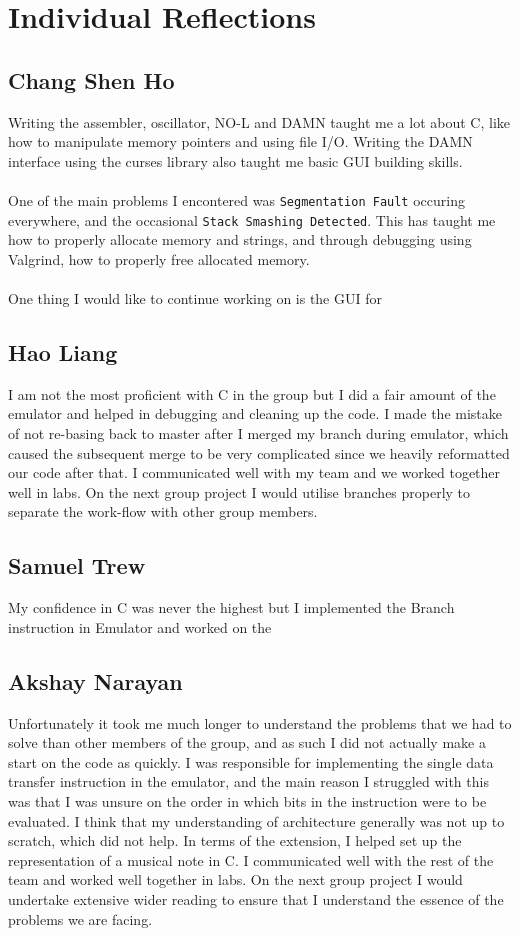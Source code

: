 \documentclass[11pt]{article}
\begin{document}
\section{Individual Reflections}
\subsection{Chang Shen Ho}
Writing the assembler, oscillator, NO-L and DAMN taught me a lot about C, like how to manipulate memory pointers and using file I/O. Writing the DAMN interface using the curses library also taught me basic GUI building skills.\\\\
One of the main problems I encontered was \texttt{Segmentation Fault} occuring everywhere, and the occasional \texttt{Stack Smashing Detected}. This has taught me how to properly allocate memory and strings, and through debugging using Valgrind, how to properly free allocated memory.\\\\
One thing I would like to continue working on is the GUI for 

\subsection{Hao Liang}
I am not the most proficient with C in the group but I did a fair amount of the emulator and helped in debugging and cleaning up the code. I made the mistake of not re-basing back to master after I merged my branch during emulator, which caused the subsequent merge to be very complicated since we heavily reformatted our code after that. I communicated well with my team and we worked together well in labs. On the next group project I would utilise branches properly to separate the work-flow with other group members.
\subsection{Samuel Trew}
My confidence in C was never the highest but I implemented the Branch instruction in Emulator and worked on the 


\subsection{Akshay Narayan}
Unfortunately it took me much longer to understand the problems that we had to solve than other members of the group, and as such I did not actually make a start on the code as quickly. I was responsible for implementing the single data transfer instruction in the emulator, and the main reason I struggled with this was that I was unsure on the order in which bits in the instruction were to be evaluated. I think that my understanding of architecture generally was not up to scratch, which did not help. In terms of the extension, I helped set up the representation of a musical note in C. I communicated well with the rest of the team and worked well together in labs. On the next group project I would undertake extensive wider reading to ensure that I understand the essence of the problems we are facing.\\\\
\end{document}
